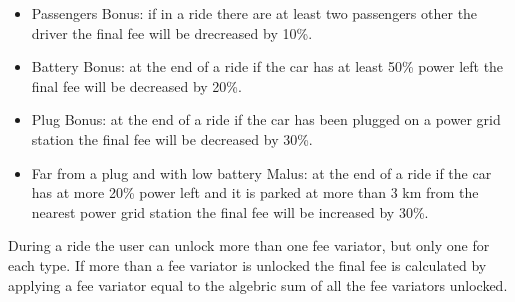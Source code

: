\begin{description}
	\begin{itemize}
		\item Passengers Bonus: if in a ride there are at least two passengers other the driver the final fee will be drecreased by 10\%.
		\item Battery Bonus: at the end of a ride if the car has at least 50\% power left the final fee will be decreased by 20\%.
		\item Plug Bonus: at the end of a ride if the car has been plugged on a power grid station the final fee will be decreased by 30\%.
		\item Far from a plug and with low battery Malus: at the end of a ride if the car has at more 20\% power left and it is parked at more than 3 km from the nearest power grid station the final fee will be increased by 30\%.
	\end{itemize}
	During a ride the user can unlock more than one fee variator, but only one for each type. If more than a fee variator is unlocked the final fee is calculated by applying a fee variator equal to the algebric sum of all the fee variators unlocked.
\end{description}
